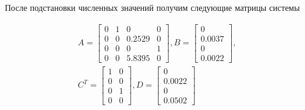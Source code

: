 После подстановки численных значений получим следующие матрицы системы

\begin{multline}
    A = \begin{bmatrix}
        0 & 1 & 0 & 0\\
        0 & 0 &  0.2529 & 0\\
        0 & 0 & 0 & 1\\
        0 & 0 & 5.8395 & 0
    \end{bmatrix}, 
    B = \begin{bmatrix}
        0\\
        0.0037\\
        0\\
        0.0022
    \end{bmatrix},\\ 
    C^T = \begin{bmatrix}
        1 & 0\\
        0 & 0\\
        0 & 1\\
        0 & 0
    \end{bmatrix}, 
    D = \begin{bmatrix}
        0\\
        0.0022\\
        0\\
        0.0502
    \end{bmatrix}
\end{multline}


\endinput